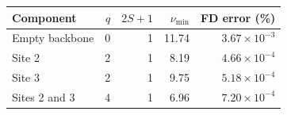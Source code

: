 \begin{tabular}{lrrrr}\toprule
Component & $q$ & $2S+1$ & $\nu_{\min}$ & FD error (\%)\\\midrule
Empty backbone & 0 & 1 & 11.74 & $3.67\times10^{-3}$\\
Site 2 & 2 & 1 & 8.19 & $4.66\times10^{-4}$\\
Site 3 & 2 & 1 & 9.75 & $5.18\times10^{-4}$\\
Sites 2 and 3 & 4 & 1 & 6.96 & $7.20\times10^{-4}$\\
\bottomrule\end{tabular}

